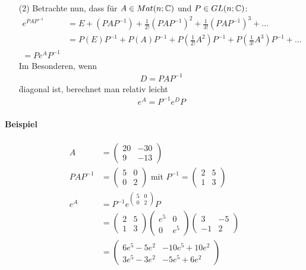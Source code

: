 \begin{itemize}
\item[(2)] Betrachte nun, dass für $A \in Mat(n; \mathbb{C})$ und $P \in GL(n; \mathbb{C})$:
\begin{align}
e^{PAP^{-1}} &= E + (PAP^{-1}) + \frac{1}{2!} (PAP^{-1})^{2} + \frac{1}{3!} (PAP^{-1})^{3} + ... \\
&= P(E)P^{-1} + P(A)P^{-1} + P(\frac{1}{2!}A^2) P^{-1} + P(\frac{1}{3!}A^3) P^{-1} + ... \\
= P e^{A} P^{-1}
\end{align}
Im Besonderen, wenn
\begin{align}
D = PAP^{-1}
\end{align}
\f{diagonal} ist, berechnet man relativ leicht
\begin{align}
e^{A} = P^{-1} e^D P
\end{align}
\end{itemize}

\paragraph{Beispiel}
\begin{align}
A &= \begin{pmatrix} 20 & -30 \\ 9 & -13\end{pmatrix} \\
PAP^{-1} &= \begin{pmatrix} 5 & 0 \\ 0 & 2 \end{pmatrix} \text{ mit } P^{-1} = \begin{pmatrix} 2 & 5 \\ 1 & 3\end{pmatrix} \\
e^{A} &= P^{-1} e^{\begin{pmatrix} 5 & 0 \\ 0 & 2\end{pmatrix}} P \\
&= \begin{pmatrix} 2 & 5 \\ 1 & 3\end{pmatrix} \begin{pmatrix} e^5 & 0 \\ 0 & e^5 \end{pmatrix} \begin{pmatrix} 3 & -5 \\ -1 & 2 \end{pmatrix} \\
&= \begin{pmatrix} 6e^5 - 5e^2 & -10e^5 + 10e^2 \\ 3e^5 - 3e^2 & -5e^5 + 6e^2 \end{pmatrix} 
\end{align}

